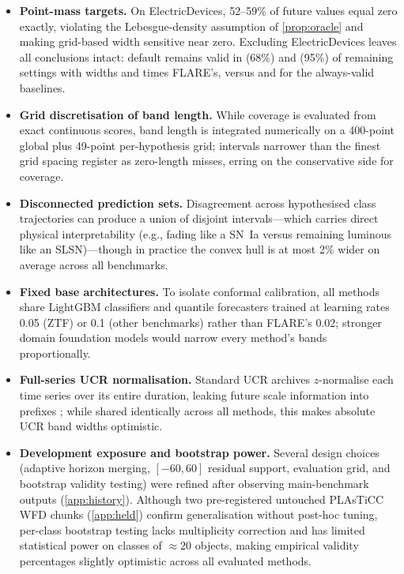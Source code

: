 \begin{itemize}
\item \textbf{Point-mass targets.} On ElectricDevices, 52--59\% of future values equal zero exactly, violating the Lebesgue-density assumption of \cref{prop:oracle} and making grid-based width sensitive near zero. Excluding ElectricDevices leaves all conclusions intact: default \gamut{} remains valid in \NoEDValidGamutSixtyeight{} (68\%) and \NoEDValidGamutNinetyfive{} (95\%) of remaining settings with widths \NoEDWidthGamutSixtyeight{} and \NoEDWidthGamutNinetyfive{} times FLARE's, versus \NoEDWidthValidSixtyeight{} and \NoEDWidthValidNinetyfive{} for the always-valid baselines.
\item \textbf{Grid discretisation of band length.} While coverage is evaluated from exact continuous scores, band length is integrated numerically on a 400-point global plus 49-point per-hypothesis grid; intervals narrower than the finest grid spacing register as zero-length misses, erring on the conservative side for coverage.
\item \textbf{Disconnected prediction sets.} Disagreement across hypothesised class trajectories can produce a union of disjoint intervals---which carries direct physical interpretability (e.g., fading like a SN~Ia versus remaining luminous like an SLSN)---though in practice the convex hull is at most 2\% wider on average across all benchmarks.
\item \textbf{Fixed base architectures.} To isolate conformal calibration, all methods share LightGBM classifiers and quantile forecasters trained at learning rates 0.05 (ZTF) or 0.1 (other benchmarks) rather than FLARE's 0.02; stronger domain foundation models would narrow every method's bands proportionally.
\item \textbf{Full-series UCR normalisation.} Standard UCR archives $z$-normalise each time series over its entire duration, leaking future scale information into prefixes \citep{renault2025early}; while shared identically across all methods, this makes absolute UCR band widths optimistic.
\item \textbf{Development exposure and bootstrap power.} Several design choices (adaptive horizon merging, $[-60,60]$ residual support, evaluation grid, and bootstrap validity testing) were refined after observing main-benchmark outputs (\cref{app:history}). Although two pre-registered untouched PLAsTiCC WFD chunks (\cref{app:held}) confirm generalisation without post-hoc tuning, per-class bootstrap testing lacks multiplicity correction and has limited statistical power on classes of $\approx20$ objects, making empirical validity percentages slightly optimistic across all evaluated methods.
\end{itemize}
